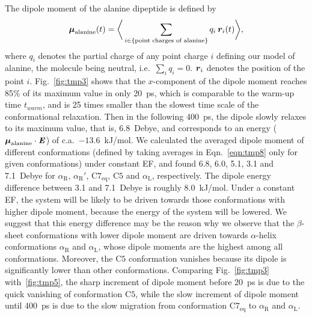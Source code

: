 \documentclass[journal=jctcce,manuscript=manuscript]{achemso}
\newcommand{\vect}[1]{\textbf{\textit{#1}}}
\newcommand{\confaa}[0]{{\alpha_{\textrm{R}}}}
\newcommand{\confab}[0]{{\alpha_{\textrm{R}}'}}
\newcommand{\confba}[0]{{\textrm{C}7_{\textrm{eq}}}}
\newcommand{\confbb}[0]{{\textrm{C}5}}
\newcommand{\confc}[0]{{\alpha_{\textrm{L}}}}
\begin{document}
The dipole moment of the alanine dipeptide is defined by
\begin{align}\label{eqn:tmp8}
  \boldsymbol\mu_{\textrm{alanine}}(t) =
  \bigg\langle
  \sum_{i\in \{\textrm{point charges of alanine}\}}
  q_i\, \vect r_i(t)
  \bigg\rangle,
\end{align}
where $q_i$ denotes the partial charge of any point charge $i$ defining our model of alanine,
the molecule being neutral, i.e.~$\sum_iq_i = 0$.
$\vect r_i$ denotes the position of the point $i$.
Fig.~\ref{fig:tmp3}
shows that the $x$-component of the dipole moment 
reaches 85\% of its maximum value in only 20~ps, which is comparable to
the warm-up time $t_{warm}$, and is 25 times
smaller than the slowest time scale of the conformational relaxation.
Then in the following 400~ps, the dipole slowly relaxes to its 
maximum value, that is, 
6.8~Debye, and  corresponds to an energy
($\boldsymbol\mu_{\textrm{alanine}} \cdot \vect E$)
of c.a.~$-13.6$~kJ/mol.
We calculated the averaged dipole moment of different conformations
(defined by taking averages in Eqn.~\eqref{eqn:tmp8}
only for given conformations)
under constant EF, and found 6.8, 6.0, 5.1, 3.1 and 7.1~Debye
for $\confaa$, $\confab$, $\confba$, $\confbb$ and $\confc$, respectively.
The dipole energy difference between 3.1 and 7.1~Debye is roughly 8.0~kJ/mol.
Under a constant EF, the system will be likely to be driven towards those
conformations with higher dipole moment, because the
energy of the system will be lowered.  We suggest that this energy difference may be the reason why
we observe that the $\beta$-sheet conformations with lower dipole moment
are driven towards $\alpha$-helix conformations
$\confaa$ and $\confc$, whose dipole moments are the highest
among all conformations. Moreover, the $\confbb$ conformation vanishes because
its dipole is significantly lower than other conformations.
Comparing Fig.~\ref{fig:tmp3} with~\ref{fig:tmp5},
  the sharp increment of dipole moment before 20~ps is due to the quick vanishing of conformation
  $\confbb$, while the slow increment of dipole moment until 400~ps is due to
  the slow migration from conformation $\confba$ to $\confaa$ and $\confc$.
\end{document}
